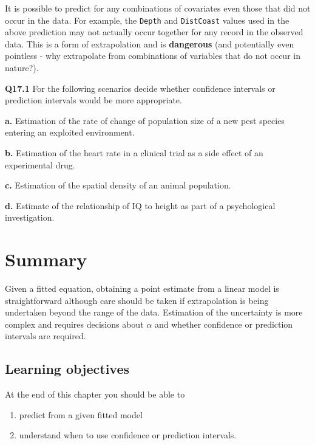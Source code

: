 \documentclass[
  oneside]{krantz}
\providecommand{\tightlist}{%
  \setlength{\itemsep}{0pt}\setlength{\parskip}{0pt}}
\begin{document}
It is possible to predict for any combinations of covariates even those that did not occur in the data. For example, the \texttt{Depth} and \texttt{DistCoast} values used in the above prediction may not actually occur together for any record in the observed data. This is a form of extrapolation and is \textbf{dangerous} (and potentially even pointless - why extrapolate from combinations of variables that do not occur in nature?).

\textbf{Q17.1} For the following scenarios decide whether confidence intervals or prediction intervals would be more appropriate.

\textbf{a.} Estimation of the rate of change of population size of a new pest species entering an exploited environment.

\textbf{b.} Estimation of the heart rate in a clinical trial as a side effect of an experimental drug.

\textbf{c.} Estimation of the spatial density of an animal population.

\textbf{d.} Estimate of the relationship of IQ to height as part of a psychological investigation.

\hypertarget{SUMpred}{%
\section{Summary}\label{SUMpred}}

Given a fitted equation, obtaining a point estimate from a linear model is straightforward although care should be taken if extrapolation is being undertaken beyond the range of the data. Estimation of the uncertainty is more complex and requires decisions about \(\alpha\) and whether confidence or prediction intervals are required.

\hypertarget{learning-objectives-5}{%
\subsection{Learning objectives}\label{learning-objectives-5}}

At the end of this chapter you should be able to

\begin{enumerate}
\def\labelenumi{\arabic{enumi}.}
\tightlist
\item
  predict from a given fitted model
\item
  understand when to use confidence or prediction intervals.
\end{enumerate}
\end{document}
